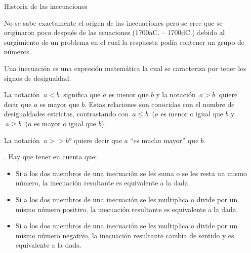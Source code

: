 \begin{myexampleblock}{Historia de las inecuaciones}

\vspace{2mm} No se sabe exactamente el origen de las inecuaciones pero se cree que se originaron poco después de las ecuaciones (1700aC. – 1700dC.) debido al surgimiento de un problema en el cual la respuesta podía contener un grupo de números.

\vspace{2mm} Una inecuación es una expresión matemática la cual se caracteriza por tener los signos de desigualdad.

\vspace{2mm} La notación $\ a < b \ $ significa que $a$ es menor que $b$ y la notación $\ a > b \ $ quiere decir que $a$ es mayor que $b$. Estas relaciones son conocidas con el nombre de desigualdades estrictas, contrastando con $ \ a \leqslant b\ $ ($a$ es menor o igual que $b$  y $\ a \geqslant b\ $ ($a$ es mayor o igual que $b$).

\vspace{2mm} La notación $\ a >> bº $ quiere decir que $a$ ``es mucho mayor'' que $b$. 
	
\end{myexampleblock}


\vspace{5mm}
\begin{theorem}
.	Hay que tener en cuenta que:

\begin{itemize}
\item Si a los dos miembros de una inecuación se les suma o se les resta un mismo número, la inecuación resultante es equivalente a la dada.
\item Si a los dos miembros de una inecuación se les multiplica o divide por un mismo número positivo, la inecuación resultante es equivalente a la dada.
\item Si a los dos miembros de una inecuación se les multiplica o divide por un mismo número negativo, la inecuación resultante cambia de sentido y es equivalente a la dada.
\end{itemize}
\end{theorem}

\vspace{5mm}

